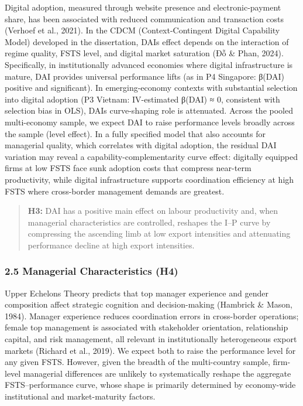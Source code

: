 \documentclass[12pt,a4paper]{article}
\begin{document}
Digital adoption, measured through website presence and
electronic-payment share, has been associated with reduced communication
and transaction costs (Verhoef et al., 2021). In the CDCM
(Context-Contingent Digital Capability Model) developed in the
dissertation, DAI\textquotesingle s effect depends on the interaction of
regime quality, FSTS level, and digital market saturation (Đỗ \& Phan,
2024). Specifically, in institutionally advanced economies where digital
infrastructure is mature, DAI provides universal performance lifts (as
in P4 Singapore: β(DAI) positive and significant). In emerging-economy
contexts with substantial selection into digital adoption (P3 Vietnam:
IV-estimated β(DAI) ≈ 0, consistent with selection bias in OLS),
DAI\textquotesingle s curve-shaping role is attenuated. Across the
pooled multi-economy sample, we expect DAI to raise performance levels
broadly across the sample (level effect). In a fully specified model
that also accounts for managerial quality, which correlates with digital
adoption, the residual DAI variation may reveal a
capability-complementarity curve effect: digitally equipped firms at low
FSTS face sunk adoption costs that compress near-term productivity,
while digital infrastructure supports coordination efficiency at high
FSTS where cross-border management demands are greatest.

\begin{quote}
\textbf{H3:} DAI has a positive main effect on labour productivity and,
when managerial characteristics are controlled, reshapes the I--P curve
by compressing the ascending limb at low export intensities and
attenuating performance decline at high export intensities.
\end{quote}

\hypertarget{25-managerial-characteristics-h4}{%
\subsubsection{2.5 Managerial Characteristics
(H4)}\label{25-managerial-characteristics-h4}}

Upper Echelons Theory predicts that top manager experience and gender
composition affect strategic cognition and decision-making (Hambrick \&
Mason, 1984). Manager experience reduces coordination errors in
cross-border operations; female top management is associated with
stakeholder orientation, relationship capital, and risk management, all
relevant in institutionally heterogeneous export markets (Richard et
al., 2019). We expect both to raise the performance level for any given
FSTS. However, given the breadth of the multi-country sample, firm-level
managerial differences are unlikely to systematically reshape the
aggregate FSTS--performance curve, whose shape is primarily determined
by economy-wide institutional and market-maturity factors.
\end{document}
